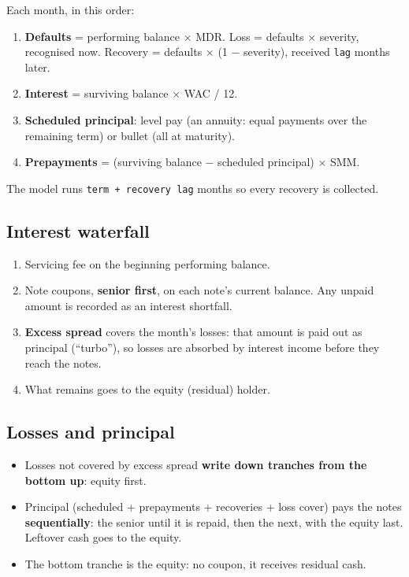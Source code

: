 \documentclass[10pt,a4paper]{article}
\providecommand{\tightlist}{\setlength{\itemsep}{1pt}\setlength{\parskip}{0pt}}
\numberwithin{equation}{section}
\begin{document}
Each month, in this order:

\begin{enumerate}
\def\labelenumi{\arabic{enumi}.}
\tightlist
\item
  \textbf{Defaults} = performing balance × MDR. Loss = defaults × severity, recognised now. Recovery = defaults × (1 − severity), received \texttt{lag} months later.
\item
  \textbf{Interest} = surviving balance × WAC / 12.
\item
  \textbf{Scheduled principal}: level pay (an annuity: equal payments over the remaining term) or bullet (all at maturity).
\item
  \textbf{Prepayments} = (surviving balance − scheduled principal) × SMM.
\end{enumerate}

The model runs \texttt{term\ +\ recovery\ lag} months so every recovery is collected.

\subsection{Interest waterfall}\label{interest-waterfall}

\begin{enumerate}
\def\labelenumi{\arabic{enumi}.}
\tightlist
\item
  Servicing fee on the beginning performing balance.
\item
  Note coupons, \textbf{senior first}, on each note's current balance. Any unpaid amount is recorded as an interest shortfall.
\item
  \textbf{Excess spread} covers the month's losses: that amount is paid out as principal (``turbo''), so losses are absorbed by interest income before they reach the notes.
\item
  What remains goes to the equity (residual) holder.
\end{enumerate}

\subsection{Losses and principal}\label{losses-and-principal}

\begin{itemize}
\tightlist
\item
  Losses not covered by excess spread \textbf{write down tranches from the bottom up}: equity first.
\item
  Principal (scheduled + prepayments + recoveries + loss cover) pays the notes \textbf{sequentially}: the senior until it is repaid, then the next, with the equity last. Leftover cash goes to the equity.
\item
  The bottom tranche is the equity: no coupon, it receives residual cash.
\end{itemize}
\end{document}
